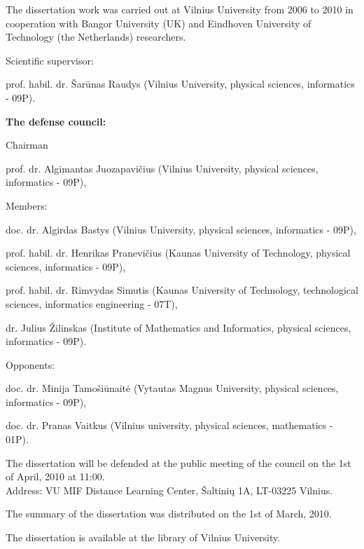 \begin{singlespace}
\noindent The dissertation work was carried out at Vilnius University from 2006 to 2010 in cooperation with Bangor University (UK) and Eindhoven University of Technology (the Netherlands) researchers.

\vspace{1cm}

\noindent Scientific supervisor:
\vspace{0.5cm}
\begin{singlespace}
prof. habil. dr. Šarūnas Raudys (Vilnius University, physical sciences, informatics - 09P).
\end{singlespace}
\vspace{1cm}
	
\noindent\textbf{The defense council:}

\vspace{0.5cm}
	
\noindent Chairman

prof. dr. Algimantas Juozapavičius (Vilnius University, physical sciences, informatics - 09P),

\noindent Members:

doc. dr. Algirdas Bastys (Vilnius University, physical sciences, informatics - 09P),

prof. habil. dr. Henrikas Pranevičius (Kaunas University of Technology, physical sciences, informatics - 09P),

prof. habil. dr. Rimvydas Simutis (Kaunas University of Technology, technological sciences, informatics engineering - 07T), 

dr. Julius Žilinskas (Institute of Mathematics and Informatics, physical sciences, informatics - 09P).

\vspace{1cm}

\noindent Opponents:

doc. dr. Minija Tamošiūnaitė (Vytautas Magnus University, physical sciences, informatics - 09P),

doc. dr. Pranas Vaitkus (Vilnius university, physical sciences, mathematics - 01P).
\\


\vspace{1cm}
	
\noindent The dissertation will be defended at the public meeting of the council on the 1st of April, 2010 at 11:00. \\
Address: VU MIF Distance Learning Center, Šaltinių 1A, LT-03225 Vilnius.

\vspace{1cm}
\noindent The summary of the dissertation was distributed on the 1st of March, 2010.

\noindent The dissertation is available at the library of Vilnius University.
\end{singlespace}